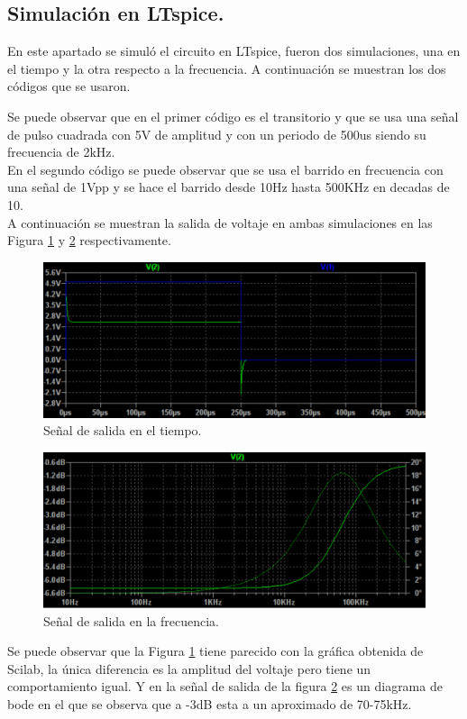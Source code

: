 \documentclass[12pt,a4paper]{article}
\newcounter{ns}
\begin{document}
\subsection{Simulación en LTspice.}
En este apartado se simuló el circuito en LTspice, fueron dos simulaciones, una en el tiempo y la otra respecto a la frecuencia. A continuación se muestran los dos códigos que se usaron.
\begin{center}

\end{center}
\begin{center}

\end{center}
Se puede observar que en el primer código es el transitorio y que se usa una señal de pulso cuadrada con 5V de amplitud y con un periodo de 500us siendo su frecuencia de 2kHz.\\[12pt]
En el segundo código se puede observar que se usa el barrido en frecuencia con una señal de 1Vpp y se hace el barrido desde 10Hz hasta 500KHz en decadas de 10.\\[12pt]
A continuación se muestran la salida de voltaje en ambas simulaciones en las Figura \ref{Figura3} y \ref{Figura4} respectivamente.
\newpage
\begin{figure}[h!]
\centering
\includegraphics[scale=0.8]{Simulacion_transitoria.pdf}
\caption{Señal de salida en el tiempo.}
\label{Figura3}
\end{figure}
\begin{figure}[h!]
\centering
\includegraphics[scale=0.8]{Simulacion_frecuencia.pdf}
\caption{Señal de salida en la frecuencia.}
\label{Figura4}
\end{figure}
Se puede observar que la Figura \ref{Figura3} tiene parecido con la gráfica obtenida de Scilab, la única diferencia es la amplitud del voltaje pero tiene un comportamiento igual. Y en la señal de salida de la figura \ref{Figura4} es un diagrama de bode en el que se observa que a -3dB esta a un aproximado de 70-75kHz.
\newpage
\end{document}
